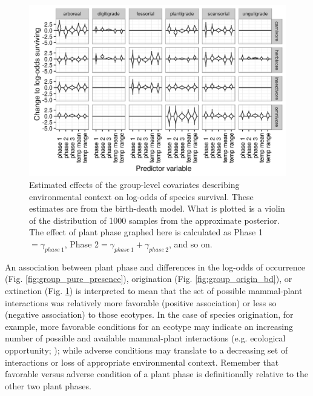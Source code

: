 \begin{figure}[ht]
  \centering
  \includegraphics[width=\textwidth,height=0.4\textheight,keepaspectratio=true]{chapter_coping/figure/group_on_survival_bd}
  \caption[Effects of group-level covariates on log-odds of ecotype survival as estimated from the birth-death model]{Estimated effects of the group-level covariates describing environmental context on log-odds of species survival. These estimates are from the birth-death model. What is plotted is a violin of the distribution of 1000 samples from the approximate posterior. The effect of plant phase graphed here is calculated as Phase 1\( = \gamma_{phase\ 1}\), Phase 2\( = \gamma_{phase\ 1} + \gamma_{phase\ 2}\), and so on.} 
  \label{fig:group_surv_bd}
\end{figure}



An association between plant phase and differences in the log-odds of occurrence (Fig. \ref{fig:group_pure_presence}), origination (Fig. \ref{fig:group_origin_bd}), or extinction (Fig. \ref{fig:group_surv_bd}) is interpreted to mean that the set of possible mammal-plant interactions was relatively more favorable (positive association) or less so (negative association) to those ecotypes. In the case of species origination, for example, more favorable conditions for an ecotype may indicate an increasing number of possible and available mammal-plant interactions (e.g. ecological opportunity; \citealp{Yoder2010,Losos2010,Losos2010a}); while adverse conditions may translate to a decreasing set of interactions or loss of appropriate environmental context. Remember that favorable versus adverse condition of a plant phase is definitionally relative to the other two plant phases. 

